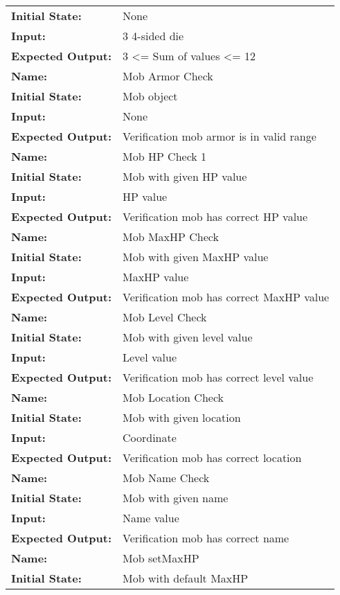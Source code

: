 \documentclass[12pt, titlepage]{article}
\begin{document}
\begin{center}
\begin{longtable}{ l | p{10cm} }
				\textbf{Initial State:} & None\\
				\textbf{Input:} & 3 4-sided die\\
				\textbf{Expected Output:} & 3 <= Sum of values <= 12\\
				\hline
				\textbf{Name:} & Mob Armor Check\\
				\textbf{Initial State:} & Mob object\\
				\textbf{Input:} & None\\
				\textbf{Expected Output:} & Verification mob armor is in valid range\\
				\hline
				\textbf{Name:} & Mob HP Check 1\\
				\textbf{Initial State:} & Mob with given HP value\\
				\textbf{Input:} & HP value\\
				\textbf{Expected Output:} & Verification mob has correct HP value\\
				\hline
				\textbf{Name:} & Mob MaxHP Check\\
				\textbf{Initial State:} & Mob with given MaxHP value\\
				\textbf{Input:} & MaxHP value\\
				\textbf{Expected Output:} & Verification mob has correct MaxHP value\\
				\hline
				\textbf{Name:} & Mob Level Check\\
				\textbf{Initial State:} & Mob with given level value\\
				\textbf{Input:} & Level value\\
				\textbf{Expected Output:} & Verification mob has correct level value\\
				\hline
				\textbf{Name:} & Mob Location Check\\
				\textbf{Initial State:} & Mob with given location\\
				\textbf{Input:} & Coordinate\\
				\textbf{Expected Output:} & Verification mob has correct location\\
				\hline
				\textbf{Name:} & Mob Name Check\\
				\textbf{Initial State:} & Mob with given name\\
				\textbf{Input:} & Name value\\
				\textbf{Expected Output:} & Verification mob has correct name\\
				\hline
				\textbf{Name:} & Mob setMaxHP\\
				\textbf{Initial State:} & Mob with default MaxHP\\

\end{longtable}
\end{center}
\end{document}

